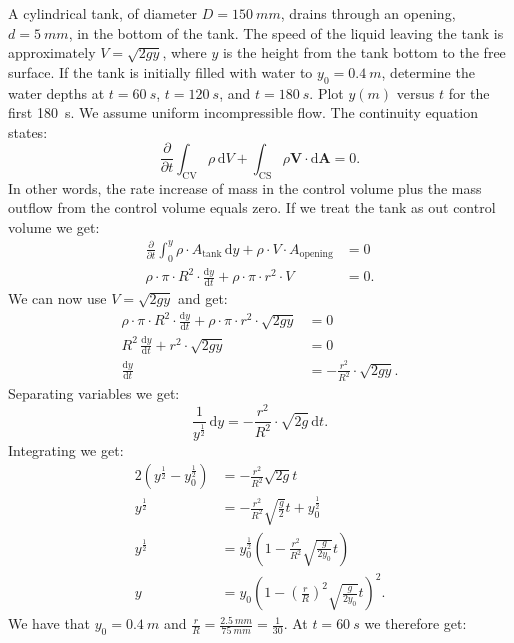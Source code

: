 A cylindrical tank, of diameter $D = \qty{150}{mm}$, drains through an opening, $d = \qty{5}{mm}$, in the bottom of the tank. The speed of the liquid leaving the tank is approximately $V = \sqrt{2gy}$, where $y$ is the height from the tank bottom to the free surface. If the tank is initially filled with water to $y_0 = \qty{0,4}{m}$, determine the water depths at $t = \qty{60}{s}$, $t = \qty{120}{s}$, and $t = \qty{180}{s}$. Plot $y(m)$ versus $t$ for the first \qty{180}{s}.
\bigbreak
We assume uniform incompressible flow. The continuity equation states:
\[ 
\frac{\partial}{\partial t} \int_{\mathrm{CV}} \rho \, \mathrm{d}V + \int_{\mathrm{CS}} \rho \textbf{V} \cdot \mathrm{d}\textbf{A} = 0
.\]
In other words, the rate increase of mass in the control volume plus the mass outflow from the control volume equals zero. If we treat the tank as out control volume we get:
\begin{align*}
  \frac{\partial }{\partial t} \int_{0}^{y} \rho \cdot A_{\mathrm{tank}} \, \mathrm{d}y + \rho \cdot V \cdot A_{\mathrm{opening}} &= 0 \\
  \rho \cdot \pi \cdot R^2 \cdot \frac{\mathrm{d}y}{\mathrm{d}t} + \rho \cdot \pi \cdot r^2 \cdot V &= 0
.\end{align*}
We can now use $V = \sqrt{2gy}$ and get:
\begin{align*}
  \rho \cdot \pi \cdot R^2 \cdot \frac{\mathrm{d}y}{\mathrm{d}t} + \rho \cdot \pi \cdot r^2 \cdot \sqrt{2gy} &= 0 \\
  R^2 \, \frac{\mathrm{d}y}{\mathrm{d}t} + r^2 \cdot \sqrt{2gy} &= 0 \\
  \frac{\mathrm{d}y}{\mathrm{d}t} &= - \frac{r^2}{R^2} \cdot \sqrt{2gy}
.\end{align*}
Separating variables we get:
\[ 
\frac{1}{y^{\frac{1}{2}}} \, \mathrm{d}y = - \frac{r^2}{R^2} \cdot \sqrt{2g} \, \mathrm{d}t
.\]
Integrating we get:
\begin{align*}
  2 \left( y^{\frac{1}{2}} - y_0^{\frac{1}{2}} \right) &= - \frac{r^2}{R^2} \sqrt{2g}t \\
  y^{\frac{1}{2}} &= - \frac{r^2}{R^2} \sqrt{\frac{g}{2}} t + y_0^{\frac{1}{2}} \\
  y^{\frac{1}{2}} &= y_0^{\frac{1}{2}} \left( 1 - \frac{r^2}{R^2} \sqrt{\frac{g}{2y_0}} t \right) \\
  y &= y_0 \left( 1 - \left( \frac{r}{R} \right)^2 \sqrt{\frac{g}{2 y_0}} t \right)^2
.\end{align*}
We have that $y_0 = \qty{0,4}{m}$ and $\frac{r}{R} = \frac{\qty{2,5}{mm}}{\qty{75}{mm}} = \frac{1}{30}$. At $t = \qty{60}{s}$ we therefore get:
